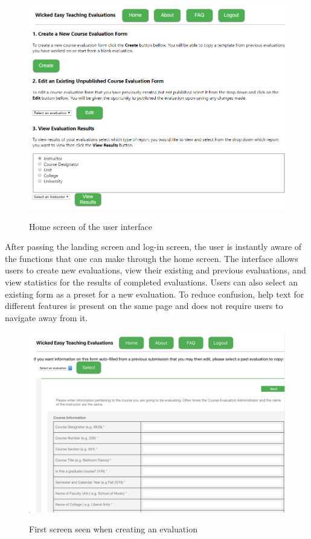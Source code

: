 \documentclass{article}
\begin{document}
\begin{center}
\begin{figure}[H]
    \centering
    {\includegraphics[scale=.6]{images/homeScreen.png}}
    \caption{Home screen of the user interface}
\end{figure}
\end{center}

After passing the landing screen and log-in screen, the user is instantly aware of the functions that one can make through the home screen. The interface allows users to create new evaluations, view their existing and previous evaluations, and view statistics for the results of completed evaluations. Users can also select an existing form as a preset for a new evaluation. To reduce confusion, help text for different features is present on the same page and does not require users to navigate away from it.

\begin{center}
\begin{figure}[H]
  \centering
  {\includegraphics[width=6in]{images/final_create_screen.png}}
   \caption{First screen seen when creating an evaluation}
\end{figure}
\end{center}
\end{document}
